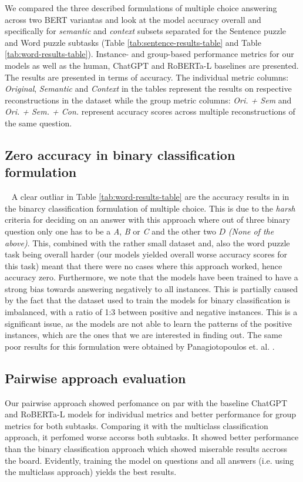 We compared the three described formulations of multiple choice answering across two BERT variantas and look at the model accuracy overall and specifically for \emph{semantic} and \emph{context} subsets separated for the Sentence puzzle and Word puzzle subtasks (Table \ref{tab:sentence-results-table} and Table \ref{tab:word-results-table}). 
Instance- and group-based performance metrics for our models as well as the human, ChatGPT and RoBERTa-L baselines are presented.
The results are presented in terms of accuracy.
The individual metric columns: \emph{Original}, \emph{Semantic} and \emph{Context} in the tables represent the results on respective reconstructions in the dataset while the group metric columns: \emph{Ori. + Sem} and \emph{Ori. + Sem. + Con.} represent accuracy scores across multiple reconstructions of the same question.

\subsection{Zero accuracy in binary classification formulation} \ %
A clear outliar in Table \ref{tab:word-results-table} are the accuracy results in in the binarcy classification formulation of multiple choice.
This is due to the \emph{harsh} criteria for deciding on an answer with this approach where out of three binary question only one has to be a \emph{A}, \emph{B} or \emph{C} and the other two $D$ \emph{(None of the above)}.
This, combined with the rather small dataset and, also the word puzzle task being overall harder (our models yielded overall worse accuracy scores for this task) meant that there were no cases where this approach worked, hence accuracy zero.
Furthermore, we note that the models have been trained to have a strong bias towards answering negatively to all instances.
This is partially caused by the fact that the dataset used to train the models for binary classification is imbalanced, with a ratio of 1:3 between positive and negative instances.
This is a significant issue, as the models are not able to learn the patterns of the positive instances, which are the ones that we are interested in finding out.
The same poor results for this formulation were obtained by Panagiotopoulos et. al. \citep{ails-lab}.

\subsection{Pairwise approach evaluation}
Our pairwise approach showed perfomance on par with the baseline ChatGPT and RoBERTa-L models\citep{semeval} for individual metrics and better performance for group metrics for both subtasks.
Comparing it with the multiclass classification approach, it perfomed worse accorss both subtasks.
It showed better performance than the binary classification approach which showed miserable results accross the board.
Evidently, training the model on questions and all answers (i.e. using the multiclass approach) yields the best results.
